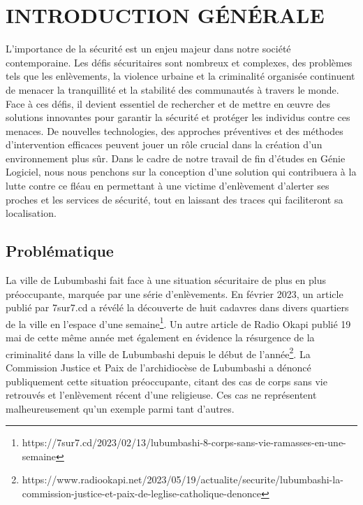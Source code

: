 \chapter*{INTRODUCTION GÉNÉRALE}
\justifying
\large
\setlength{\parindent}{2.5em}

L'importance de la sécurité est un enjeu majeur dans notre société contemporaine. Les défis sécuritaires sont nombreux et complexes, des problèmes tels que les enlèvements, la violence urbaine et la criminalité organisée continuent de menacer la tranquillité et la stabilité des communautés à travers le monde.\\

Face à ces défis, il devient essentiel de rechercher et de mettre en œuvre des solutions innovantes pour garantir la sécurité et protéger les individus contre ces menaces. De nouvelles technologies, des approches préventives et des méthodes d'intervention efficaces peuvent jouer un rôle crucial dans la création d'un environnement plus sûr.
Dans le cadre de notre travail de fin d’études en Génie Logiciel, nous nous penchons sur la conception d’une solution qui contribuera à la lutte contre ce fléau en permettant à une victime d'enlèvement d'alerter ses proches et les services de sécurité, tout en laissant des traces qui faciliteront sa localisation.

\section{Problématique}

La ville de Lubumbashi fait face à une situation sécuritaire de plus en plus préoccupante, marquée par une série d'enlèvements. En février 2023, un article publié par 7sur7.cd a révélé la découverte de huit cadavres dans divers quartiers de la ville en l'espace d'une semaine\footnote{https://7sur7.cd/2023/02/13/lubumbashi-8-corps-sans-vie-ramasses-en-une-semaine}. Un autre article de Radio Okapi publié 19 mai de cette même année met également en évidence la résurgence de la criminalité dans la ville de Lubumbashi depuis le début de l'année\footnote{https://www.radiookapi.net/2023/05/19/actualite/securite/lubumbashi-la-commission-justice-et-paix-de-leglise-catholique-denonce }. La Commission Justice et Paix de l'archidiocèse de Lubumbashi a dénoncé publiquement cette situation préoccupante, citant des cas de corps sans vie retrouvés et l'enlèvement récent d'une religieuse.  Ces cas ne représentent malheureusement qu'un exemple parmi tant d'autres.\\

